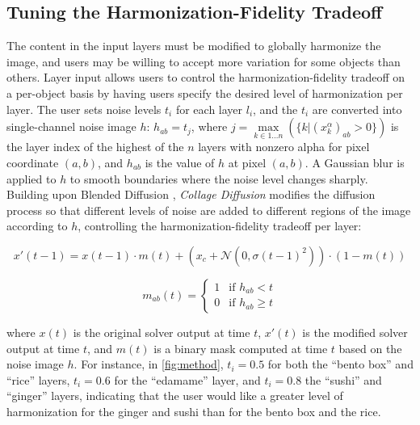 \subsection{Tuning the Harmonization-Fidelity Tradeoff}
\label{method:layerNoise} 
\vspace{-0.5em}
The content in the input layers must be modified to globally harmonize the image, and users may be willing to accept more variation for some objects than others. 
Layer input allows users to control the harmonization-fidelity tradeoff on a per-object basis by having users specify the desired level of harmonization per layer. 
The user sets noise levels $t_i$ for each layer $l_i$, and the $t_i$ are converted into single-channel noise image $h$: $h_{ab} = t_j$, where $j = \max\limits_{k \in 1 \dots n}(\{k | (x^\alpha_{k})_{ab}  > 0\})$ is the layer index of the highest of the $n$ layers with nonzero alpha for pixel coordinate $(a,b)$, and $h_{ab}$ is the value of $h$ at pixel $(a,b)$.
A Gaussian blur is applied to $h$ to smooth boundaries where the noise level changes sharply. 
Building upon Blended Diffusion \cite{avrahami2022blended}, \textit{Collage Diffusion} modifies the diffusion process so that different levels of noise are added to different regions of the image according to $h$, controlling the harmonization-fidelity tradeoff per layer:

\vspace{-1em}
\begin{dmath}
x'(t-1) = x(t-1) \cdot m(t) + (x_c + \mathcal{N}(0,\sigma(t-1)^2)) \cdot (1 - m(t))
\end{dmath}
\vspace{-0.5em}

\begin{dmath}
m_{ab}(t) =
\begin{cases}
    1 & \text{if }h_{ab}<t\\    
    0 & \text{if }h_{ab}\ge t
\end{cases}
\end{dmath}
\vspace{-0.5em}

\noindent where $x(t)$ is the original solver output at time $t$, $x'(t)$ is the modified solver output at time $t$, and $m(t)$ is a binary mask computed at time $t$ based on the noise image $h$. 
For instance, in \cref{fig:method}, $t_i=0.5$ for both the ``bento box'' and ``rice'' layers, $t_i=0.6$ for the ``edamame'' layer, and $t_i=0.8$ the ``sushi'' and ``ginger'' layers, indicating that the user would like a greater level of harmonization for the ginger and sushi than for the bento box and the rice. 


